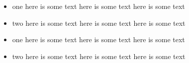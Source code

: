 \begin{myenv}
	\begin{itemize}\item
		      one
		      here is some text
		      here is some text
		      here is some text\item
		      two
		      here is some text
		      here is some text
		      here is some text
	\end{itemize}
\end{myenv}
\begin{itemize}\item
	      one
	      here is some text
	      here is some text
	      here is some text\item
	      two
	      here is some text
	      here is some text
	      here is some text
\end{itemize}
